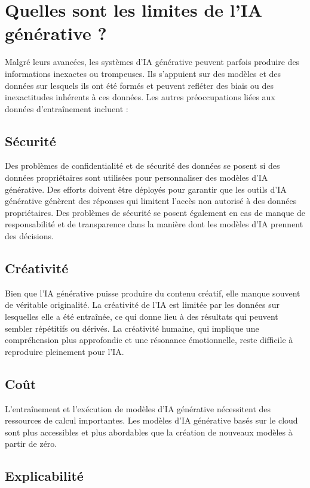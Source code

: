 \section{Quelles sont les limites de l’IA générative ?}

Malgré leurs avancées, les systèmes d’IA générative peuvent parfois produire des
informations inexactes ou trompeuses. Ils s’appuient sur des modèles et des données
sur lesquels ils ont été formés et peuvent refléter des biais ou des inexactitudes
inhérents à ces données. Les autres préoccupations liées aux données
d’entraînement incluent :

\subsection*{Sécurité}

Des problèmes de confidentialité et de sécurité des données se posent si des
données propriétaires sont utilisées pour personnaliser des modèles d’IA
générative. Des efforts doivent être déployés pour garantir que les outils d’IA générative
génèrent des réponses qui limitent l’accès non autorisé à des données propriétaires.
Des problèmes de sécurité se posent également en cas de manque de responsabilité
et de transparence dans la manière dont les modèles d’IA prennent des décisions.

\subsection*{Créativité}

Bien que l’IA générative puisse produire du contenu créatif, elle manque souvent
de véritable originalité. La créativité de l’IA est limitée par les données sur lesquelles
elle a été entraînée, ce qui donne lieu à des résultats qui peuvent sembler
répétitifs ou dérivés. La créativité humaine, qui implique une compréhension
plus approfondie et une résonance émotionnelle, reste difficile à reproduire pleinement
pour l’IA.

\subsection*{Coût}

L’entraînement et l’exécution de modèles d’IA générative nécessitent des
ressources de calcul importantes. Les modèles d’IA générative basés sur le cloud
sont plus accessibles et plus abordables que la création de nouveaux modèles à partir
de zéro.

\subsection*{Explicabilité}

